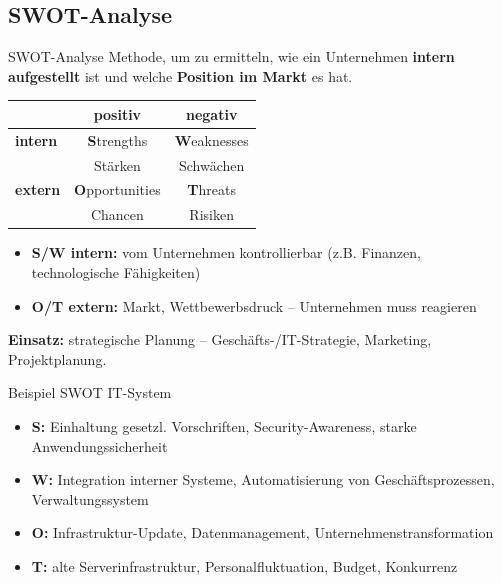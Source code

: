 \documentclass[a4paper, fontsize=7pt]{scrartcl}
\renewcommand*{\arraystretch}{1.5}  %
\begin{document}
\subsection{SWOT-Analyse}

\begin{mainbox}{SWOT-Analyse}
Methode, um zu ermitteln, wie ein Unternehmen \textbf{intern aufgestellt} ist
und welche \textbf{Position im Markt} es hat.
\renewcommand*{\arraystretch}{1.3}
\begin{center}
\begin{tabular}{l|c|c}
 & \textbf{positiv} & \textbf{negativ} \\
\hline
\textbf{intern} & \textbf{S}trengths & \textbf{W}eaknesses \\
 & Stärken & Schwächen \\
\hline
\textbf{extern} & \textbf{O}pportunities & \textbf{T}hreats \\
 & Chancen & Risiken \\
\end{tabular}
\end{center}
\begin{itemize}
    \item \textbf{S/W intern:} vom Unternehmen kontrollierbar (z.B.
          Finanzen, technologische Fähigkeiten)
    \item \textbf{O/T extern:} Markt, Wettbewerbsdruck -- Unternehmen muss
          reagieren
\end{itemize}
\textbf{Einsatz:} strategische Planung -- Geschäfts-/IT-Strategie, Marketing,
Projektplanung.
\end{mainbox}

\begin{subbox}{Beispiel SWOT IT-System}
\begin{itemize}
    \item \textbf{S:} Einhaltung gesetzl. Vorschriften, Security-Awareness,
          starke Anwendungssicherheit
    \item \textbf{W:} Integration interner Systeme, Automatisierung von
          Geschäftsprozessen, Verwaltungssystem
    \item \textbf{O:} Infrastruktur-Update, Datenmanagement,
          Unternehmenstransformation
    \item \textbf{T:} alte Serverinfrastruktur, Personalfluktuation, Budget,
          Konkurrenz
\end{itemize}
\end{subbox}
\end{document}
